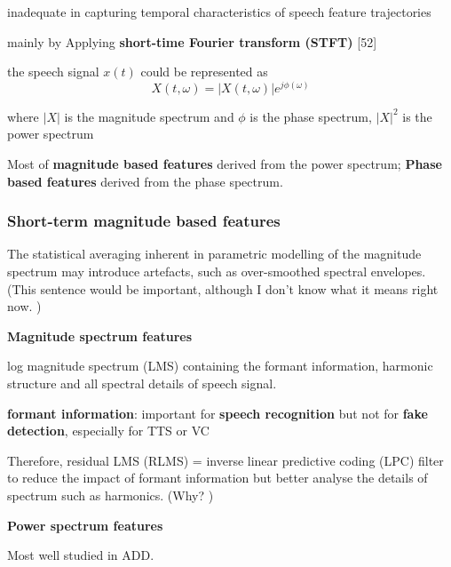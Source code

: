 \documentclass{article}
\begin{document}
inadequate in capturing temporal characteristics of speech feature trajectories

mainly by Applying \textbf{short-time Fourier transform (STFT)} [52]

the speech signal $x(t)$ could be represented as 
\[
X(t,\omega) = |X(t, \omega)|e^{j\phi(\omega)}
\]

where $|X|$ is the magnitude spectrum and $\phi$ is the phase spectrum, $|X|^2$ is the power spectrum

Most of \textbf{magnitude based features} derived from the power spectrum; \textbf{Phase based features} derived from the phase spectrum. 


\subsubsection{Short-term magnitude based features}

The statistical averaging inherent in parametric modelling of the magnitude spectrum may introduce artefacts, such as over-smoothed spectral envelopes. 
(This sentence would be important, although I don't know what it means right now. )

\vspace{5pt}
\textbf{Magnitude spectrum features}

log magnitude spectrum (LMS) containing the formant information, harmonic structure and all spectral details of speech signal. 

\textbf{formant information}: important for \textbf{speech recognition} but not for \textbf{fake detection}, especially for TTS or VC

Therefore, residual LMS (RLMS) = inverse linear predictive coding (LPC) filter to reduce the impact of formant information but better analyse the details of spectrum such as harmonics. (Why? )

\vspace{5pt}

\textbf{Power spectrum features}

Most well studied in ADD. 
\end{document}
